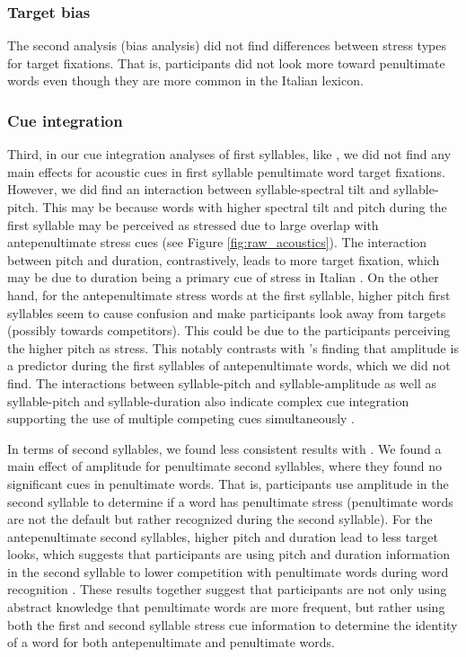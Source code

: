 \subsubsection{Target bias}

The second analysis (bias analysis) did not find differences between stress types for target fixations. That is, participants did not look more toward penultimate words even though they are more common in the Italian lexicon. 

\subsubsection{Cue integration}

Third, in our cue integration analyses of first syllables, like \cite{Sulpizio_McQueen_2012}, we did not find any main effects for acoustic cues in first syllable penultimate word target fixations. However, we did find an interaction between syllable-spectral tilt and syllable-pitch. This may be because words with higher spectral tilt and pitch during the first syllable may be perceived as stressed due to large overlap with antepenultimate stress cues (see Figure \ref{fig:raw_acoustics}). The interaction between pitch and duration, contrastively, leads to more target fixation, which may be due to duration being a primary cue of stress in Italian \cite{Alfano2006}. On the other hand, for the antepenultimate stress words at the first syllable, higher pitch first syllables seem to cause confusion and make participants look away from targets (possibly towards competitors). This could be due to the participants perceiving the higher pitch as stress. This notably contrasts with \cite{Sulpizio_McQueen_2012}'s finding that amplitude is a predictor during the first syllables of antepenultimate words, which we did not find. The interactions between syllable-pitch and syllable-amplitude as well as syllable-pitch and syllable-duration also indicate complex cue integration supporting the use of multiple competing cues simultaneously \citep{Kong2016}.

In terms of second syllables, we found less consistent results with \cite{Sulpizio_McQueen_2012}. We found a main effect of amplitude for penultimate second syllables, where they found no significant cues in penultimate words. That is, participants use amplitude in the second syllable to determine if a word has penultimate stress (penultimate words are not the default but rather recognized during the second syllable). For the antepenultimate second syllables, higher pitch and duration lead to less target looks, which suggests that participants are using pitch and duration information in the second syllable to lower competition with penultimate words during word recognition \cite{McMurray2019}. These results together suggest that participants are not only using abstract knowledge that penultimate words are more frequent, but rather using both the first and second syllable stress cue information to determine the identity of a word for both antepenultimate and penultimate words.

